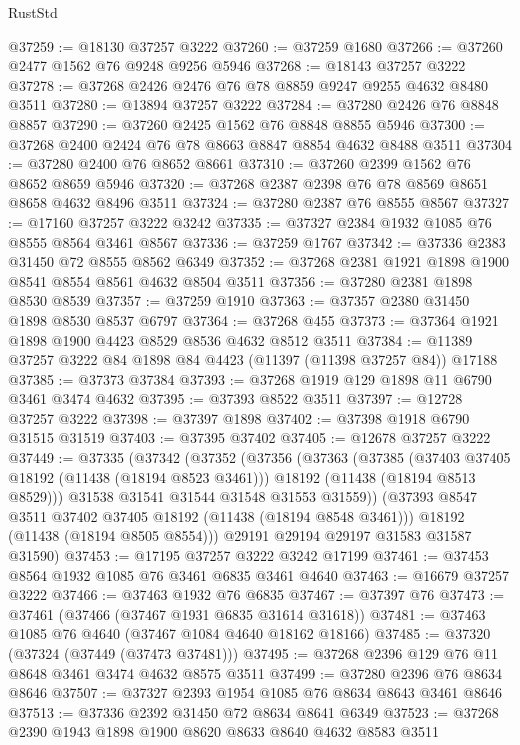 \begin{lexlean}{RustStd}
\begin{coremodule}
@37259 := @18130 @37257 @3222
@37260 := @37259 @1680
@37266 := @37260 @2477 @1562 @76 @9248 @9256 @5946
@37268 := @18143 @37257 @3222
@37278 := @37268 @2426 @2476 @76 @78 @8859 @9247 @9255 @4632 @8480 @3511
@37280 := @13894 @37257 @3222
@37284 := @37280 @2426 @76 @8848 @8857
@37290 := @37260 @2425 @1562 @76 @8848 @8855 @5946
@37300 := @37268 @2400 @2424 @76 @78 @8663 @8847 @8854 @4632 @8488 @3511
@37304 := @37280 @2400 @76 @8652 @8661
@37310 := @37260 @2399 @1562 @76 @8652 @8659 @5946
@37320 := @37268 @2387 @2398 @76 @78 @8569 @8651 @8658 @4632 @8496 @3511
@37324 := @37280 @2387 @76 @8555 @8567
@37327 := @17160 @37257 @3222 @3242
@37335 := @37327 @2384 @1932 @1085 @76 @8555 @8564 @3461 @8567
@37336 := @37259 @1767
@37342 := @37336 @2383 @31450 @72 @8555 @8562 @6349
@37352 := @37268 @2381 @1921 @1898 @1900 @8541 @8554 @8561 @4632 @8504 @3511
@37356 := @37280 @2381 @1898 @8530 @8539
@37357 := @37259 @1910
@37363 := @37357 @2380 @31450 @1898 @8530 @8537 @6797
@37364 := @37268 @455
@37373 := @37364 @1921 @1898 @1900 @4423 @8529 @8536 @4632 @8512 @3511
@37384 := @11389 @37257 @3222 @84 @1898 @84 @4423 (@11397 (@11398 @37257 @84)) @17188
@37385 := @37373 @37384
@37393 := @37268 @1919 @129 @1898 @11 @6790 @3461 @3474 @4632
@37395 := @37393 @8522 @3511
@37397 := @12728 @37257 @3222
@37398 := @37397 @1898
@37402 := @37398 @1918 @6790 @31515 @31519
@37403 := @37395 @37402
@37405 := @12678 @37257 @3222
@37449 := @37335
    (@37342
      (@37352
        (@37356
          (@37363
            (@37385
              (@37403 @37405 @18192 (@11438 (@18194 @8523 @3461)))
              @18192
              (@11438 (@18194 @8513 @8529)))
            @31538
            @31541
            @31544
            @31548
            @31553
            @31559))
        (@37393 @8547 @3511 @37402 @37405 @18192 (@11438 (@18194 @8548 @3461)))
        @18192
        (@11438 (@18194 @8505 @8554)))
      @29191
      @29194
      @29197
      @31583
      @31587
      @31590)
@37453 := @17195 @37257 @3222 @3242 @17199
@37461 := @37453 @8564 @1932 @1085 @76 @3461 @6835 @3461 @4640
@37463 := @16679 @37257 @3222
@37466 := @37463 @1932 @76 @6835
@37467 := @37397 @76
@37473 := @37461 (@37466 (@37467 @1931 @6835 @31614 @31618))
@37481 := @37463 @1085 @76 @4640 (@37467 @1084 @4640 @18162 @18166)
@37485 := @37320 (@37324 (@37449 (@37473 @37481)))
@37495 := @37268 @2396 @129 @76 @11 @8648 @3461 @3474 @4632 @8575 @3511
@37499 := @37280 @2396 @76 @8634 @8646
@37507 := @37327 @2393 @1954 @1085 @76 @8634 @8643 @3461 @8646
@37513 := @37336 @2392 @31450 @72 @8634 @8641 @6349
@37523 := @37268 @2390 @1943 @1898 @1900 @8620 @8633 @8640 @4632 @8583 @3511

\end{coremodule}
\end{lexlean}
